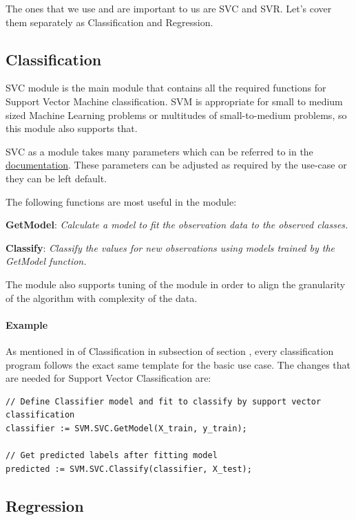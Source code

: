 The ones that we use and are important to us are SVC and SVR. Let's cover them separately as Classification and Regression.

\subsection{Classification}

SVC module is the main module that contains all the required functions for Support Vector Machine classification. SVM is appropriate for small to medium sized Machine Learning problems or multitudes of small-to-medium problems, so this module also supports that. 

SVC as a module takes many parameters which can be referred to in the \href{https://cdn.hpccsystems.com/pdf/ml/SupportVectorMachines.pdf}{documentation}. These parameters can be adjusted as required by the use-case or they can be left default. 

The following functions are most useful in the module:

\textbf{GetModel}: \textit{Calculate a model to fit the observation data to the observed classes.}

\textbf{Classify}: \textit{Classify the values for new observations using models trained by the GetModel function.}

The module also supports tuning of the module in order to align the granularity of the algorithm with complexity of the data.

\paragraph{Example}

As mentioned in  of Classification in  subsection of section , every classification program follows the exact same template for the basic use case. The changes that are needed for Support Vector Classification are:

\begin{lstlisting}
// Define Classifier model and fit to classify by support vector classification
classifier := SVM.SVC.GetModel(X_train, y_train);

// Get predicted labels after fitting model
predicted := SVM.SVC.Classify(classifier, X_test);
\end{lstlisting}

\subsection{Regression}

